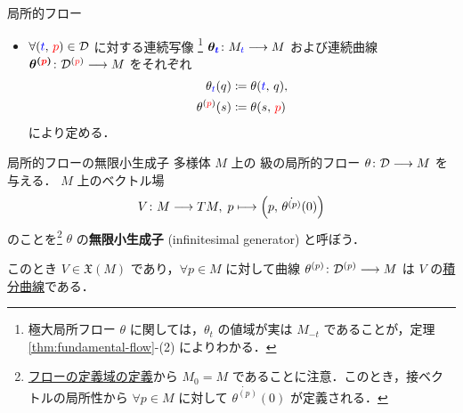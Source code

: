 \documentclass[geometry_main]{subfiles}
\begin{document}
\begin{mydef}[label=def:local-flow, breakable]{局所的フロー}
\begin{itemize}
        \begin{align}
            \bm{M_{\textcolor{blue}{t}}} \coloneqq \bigl\{\, p \in M \bigm| (\textcolor{blue}{t},\, p) \in \mathcal{D} \,\bigr\} 
        \end{align}
        と定める\footnote{$\mathcal{D}^{(p)}$ はフローの領域 $\mathcal{D}$ を，点 $(0,\, p)$ を通るように「横に切り」，$M_{\textcolor{blue}{t}}$ は「縦に切る」と言うイメージ．}．
        \item $\forall (\textcolor{blue}{t},\, \textcolor{red}{p}) \in \mathcal{D}$ に対する連続写像
        \footnote{極大局所フロー $\theta$ に関しては，$\theta_t$ の値域が実は $M_{-t}$ であることが，定理\ref{thm:fundamental-flow}-(2) によりわかる．} 
        $\bm{\theta_{\textcolor{blue}{t}}} \colon M_{\textcolor{blue}{t}} \longrightarrow M$ および連続曲線 $\bm{\theta^{(\textcolor{red}{p})}} \colon \mathcal{D}^{(\textcolor{red}{p})} \longrightarrow M$ をそれぞれ 
        \begin{align}
            \theta_{\textcolor{blue}{t}} (q) &\coloneqq \theta(\textcolor{blue}{t},\, q),\\ 
            \theta^{(\textcolor{red}{p})} (s) &\coloneqq \theta(s,\, \textcolor{red}{p})
        \end{align}
        により定める．
    \end{itemize}
\end{mydef}

\begin{myprop}[label=prop:infinitesimal-generator-local,breakable]{局所的フローの無限小生成子}
    \cinfty 多様体 $M$ 上の \cinfty 級の局所的フロー $\theta \colon \mathcal{D} \longrightarrow M$ を与える．
    $M$ 上のベクトル場
    \begin{align}
        V \colon M \longrightarrow TM,\; p \longmapsto \left( p,\, \dot{\theta^{(p)}} (0)  \right) 
    \end{align}
    のことを\footnote{\hyperref[def:local-flow]{フローの定義域の定義}から $M_0 = M$ であることに注意．このとき，接ベクトルの局所性から $\forall p \in M$ に対して $\dot{\theta^{(p)}} (0)$ が定義される．} $\theta$ の\textbf{無限小生成子} (infinitesimal generator) と呼ぼう．

    このとき $V \in \mathfrak{X}(M)$ であり，$\forall p \in M$ に対して\cinfty 曲線 $\theta^{(p)} \colon \mathcal{D}^{(p)} \longrightarrow M$ は $V$ の\hyperref[def:integral-curve]{積分曲線}である．
\end{myprop}
\end{document}
